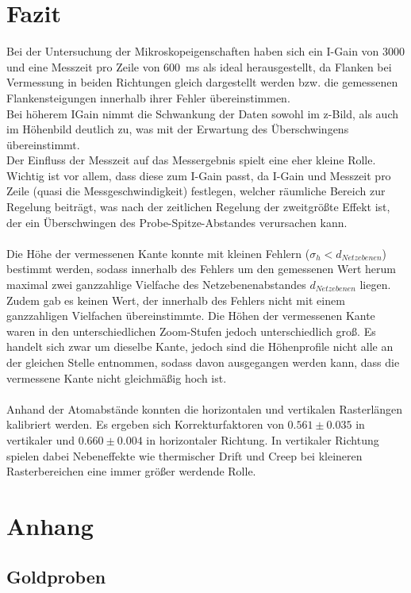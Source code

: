 \documentclass[12pt,a4paper]{article}
\begin{document}
\section{Fazit}
Bei der Untersuchung der Mikroskopeigenschaften haben sich ein I-Gain von 3000 und eine Messzeit pro Zeile von \SI{600}{ms} als ideal herausgestellt, da Flanken bei Vermessung in beiden Richtungen gleich dargestellt werden bzw. die gemessenen Flankensteigungen innerhalb ihrer Fehler übereinstimmen.\\
Bei höherem IGain nimmt die Schwankung der Daten sowohl im z-Bild, als auch im Höhenbild deutlich zu, was mit der Erwartung des Überschwingens übereinstimmt.\\
Der Einfluss der Messzeit auf das Messergebnis spielt eine eher kleine Rolle. Wichtig ist vor allem, dass diese zum I-Gain passt, da I-Gain und Messzeit pro Zeile (quasi die Messgeschwindigkeit) festlegen, welcher räumliche Bereich zur Regelung beiträgt, was nach der zeitlichen Regelung der zweitgrößte Effekt ist, der ein Überschwingen des Probe-Spitze-Abstandes verursachen kann. \\
\\
Die Höhe der vermessenen Kante konnte mit kleinen Fehlern ($\sigma _h < d_{Netzebenen}$) bestimmt werden, sodass innerhalb des Fehlers um den gemessenen Wert herum maximal zwei ganzzahlige Vielfache des Netzebenenabstandes $d_{Netzebenen}$ liegen. Zudem gab es keinen Wert, der innerhalb des Fehlers nicht mit einem ganzzahligen Vielfachen übereinstimmte. Die Höhen der vermessenen Kante waren in den unterschiedlichen Zoom-Stufen jedoch unterschiedlich groß. Es handelt sich zwar um dieselbe Kante, jedoch sind die Höhenprofile nicht alle an der gleichen Stelle entnommen, sodass davon ausgegangen werden kann, dass die vermessene Kante nicht gleichmäßig hoch ist.\\
\\
Anhand der Atomabstände konnten die horizontalen und vertikalen Rasterlängen kalibriert werden. Es ergeben sich Korrekturfaktoren von $0.561\pm 0.035$ in vertikaler und $0.660\pm 0.004$ in horizontaler Richtung. In vertikaler Richtung spielen dabei Nebeneffekte wie thermischer Drift und Creep bei kleineren Rasterbereichen eine immer größer werdende Rolle.


\newpage
\section{Anhang}
\subsection{Goldproben}
\end{document}
